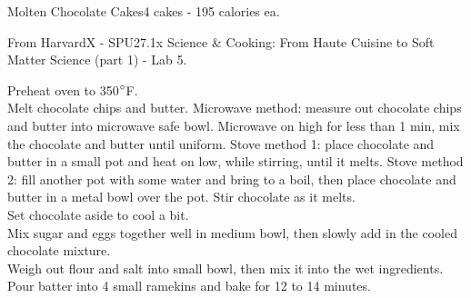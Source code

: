 \begin{recipe}{Molten Chocolate Cakes}{4 cakes - 195 calories ea.}{}

\freeform From HarvardX - SPU27.1x Science \& Cooking: From Haute Cuisine to Soft Matter Science (part 1) - Lab 5.


Preheat oven to 350$\degree$F.\\

Melt chocolate chips and butter. Microwave method: measure out chocolate chips and butter into microwave safe bowl. Microwave on high for less than 1 min, mix the chocolate and butter until uniform. Stove method 1: place chocolate and butter in a small pot and heat on low, while stirring, until it melts. Stove method 2: fill another pot with some water and bring to a boil, then place chocolate and butter in a metal bowl over the pot. Stir chocolate as it melts.\\

Set chocolate aside to cool a bit.\\

Mix sugar and eggs together well in medium bowl, then slowly add in the cooled chocolate mixture.\\

Weigh out flour and salt into small bowl, then mix it into the wet ingredients.\\

Pour batter into 4 small ramekins and bake for 12 to 14 minutes.

\end{recipe}